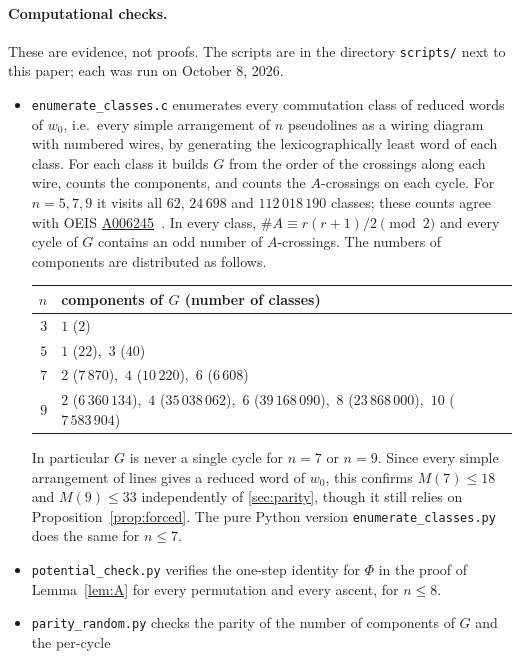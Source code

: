 \paragraph{Computational checks.} These are evidence, not proofs. The scripts are in the directory
\texttt{scripts/} next to this paper; each was run on October 8, 2026.
\begin{itemize}
\item \texttt{enumerate\_classes.c} enumerates every commutation class of reduced words of $w_0$, i.e.\
  every simple arrangement of $n$ pseudolines as a wiring diagram with numbered wires, by generating the
  lexicographically least word of each class. For each class it builds $G$ from the order of the crossings
  along each wire, counts the components, and counts the $A$-crossings on each cycle. For $n=5,7,9$ it
  visits all $62$, $24\,698$ and $112\,018\,190$ classes; these counts agree with OEIS
  \href{https://oeis.org/A006245}{A006245}~\cite{A006245}. In every class, $\#A\equiv r(r+1)/2\pmod 2$
  and every cycle of $G$ contains an odd number of $A$-crossings. The numbers of components are
  distributed as follows.
\begin{center}\small
\begin{tabular}{@{}rl@{}}
\toprule
$n$ & components of $G$ (number of classes)\\
\midrule
$3$ & $1$ ($2$)\\
$5$ & $1$ ($22$),\ $3$ ($40$)\\
$7$ & $2$ ($7\,870$),\ $4$ ($10\,220$),\ $6$ ($6\,608$)\\
$9$ & $2$ ($6\,360\,134$),\ $4$ ($35\,038\,062$),\ $6$ ($39\,168\,090$),\ $8$ ($23\,868\,000$),\ $10$ ($7\,583\,904$)\\
\bottomrule
\end{tabular}
\end{center}
  In particular $G$ is never a single cycle for $n=7$ or $n=9$. Since every simple arrangement of lines
  gives a reduced word of $w_0$, this confirms $M(7)\le18$ and $M(9)\le33$ independently of
  \cref{sec:parity}, though it still relies on Proposition~\ref{prop:forced}. The pure Python version
  \texttt{enumerate\_classes.py} does the same for $n\le7$.
\item \texttt{potential\_check.py} verifies the one-step identity for $\Phi$ in the proof of
  Lemma~\ref{lem:A} for every permutation and every ascent, for $n\le 8$.
\item \texttt{parity\_random.py} checks the parity of the number of components of $G$ and the per-cycle

\end{itemize}
